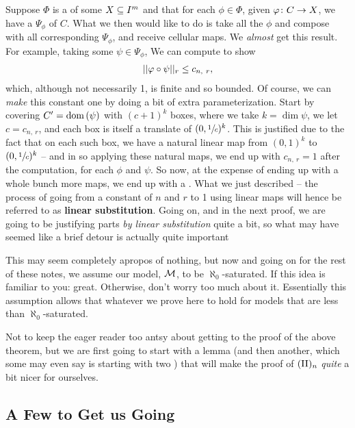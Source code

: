 \begin{remark}
  Suppose $\Phi$ is a \cellrparam of some $\CIn[X]{m}$ and that for each $\phi \in \Phi$, given $\funcdom{\phi}{C}{X}$, we have a \cellrparam $\Psi_{\phi}$ of $C$. What we then would like to do is take all the $\phi$ and compose with all corresponding $\Psi_{\phi}$, and receive cellular maps. We \emph{almost} get this result. For example, taking some $\psi \in \Psi_{\phi}$, We can compute to show
    \begin{align*}
      \rnorm[r]{\phi \circ \psi} \leq c_{n, \ r},
    \end{align*}
    which, although not necessarily 1, is finite and so bounded. Of course, we can \emph{make} this constant one by doing a bit of extra parameterization. Start by covering $\pri{C} = \dom{\psi}$ with $(c + 1)^k$ boxes, where we take $k = \dim{\psi}$, we let $c = c_{n, \ r}$, and each box is itself a translate of $(0, \sfrac{1}{c})^k$. This is justified due to the fact that on each such box, we have a natural linear map from $(0, 1)^k$ to $(0, \sfrac{1}{c})^k$ -- and in so applying these natural maps, we end up with $c_{n, \ r} = 1$ after the computation, for each $\phi$ and $\psi$. So now, at the expense of ending up with a whole bunch more maps, we end up with a \cellrparam. What we just described -- the process of going from a constant of $n$ and $r$ to 1 using linear maps will hence be referred to as \textbf{linear substitution}. Going on, and in the next proof, we are going to be justifying parts \emph{by linear substitution} quite a bit, so what may have seemed like a brief detour is actually quite important
\end{remark}


\begin{remark}
This may seem completely apropos of nothing, but now and going on for the rest of these notes, we assume our model, $\M$, to be $\aleph_0$-saturated. If this idea is familiar to you: great. Otherwise, don't worry too much about it. Essentially this assumption allows that whatever we prove here to hold for models that are less than $\aleph_0$-saturated.
\end{remark}

Not to keep the eager reader too antsy about getting to the proof of the above theorem, but we are first going to start with a lemma (and then another, which some may even say is starting with two \lemmas) that will make the proof of $\IIn$ \emph{quite} a bit nicer for ourselves.

\subsection{A Few \Lemmas to Get us Going}

